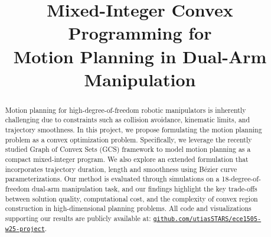 \documentclass[conference]{IEEEtran}
\begin{document}
\title{Mixed-Integer Convex Programming for \\Motion Planning in Dual-Arm Manipulation}

\author{
}

\maketitle

\begin{abstract}
Motion planning for high-degree-of-freedom robotic manipulators is inherently challenging due to constraints such as collision avoidance, kinematic limits, and trajectory smoothness. In this project, we propose formulating the motion planning problem as a convex optimization problem. Specifically, we leverage the recently studied Graph of Convex Sets (GCS) framework to model motion planning as a compact mixed-integer program. We also explore an extended formulation that incorporates trajectory duration, length and smoothness using B\'ezier curve parameterizations. Our method is evaluated through simulations on a 18-degree-of-freedom dual-arm manipulation task, and our findings highlight the key trade-offs between solution quality, computational cost, and the complexity of convex region construction in high-dimensional planning problems. All code and visualizations supporting our results are publicly available at: \href{https://github.com/utiasSTARS/ece1505-w25-project}{\texttt{github.com/utiasSTARS/ece1505-w25-project}}.
\end{abstract}









\appendices

\end{document}
